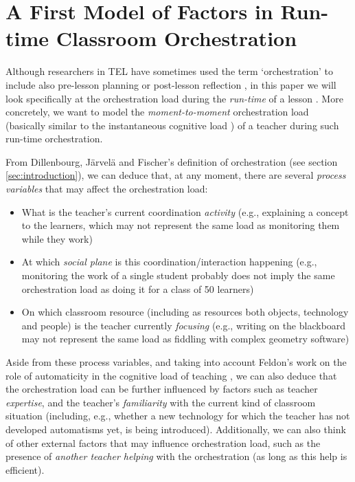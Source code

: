 \documentclass[10pt,journal,compsoc]{IEEEtran}
\begin{document}
\section{A First Model of Factors in Run-time Classroom Orchestration}
\label{sec:model}

Although researchers in TEL have sometimes used the term `orchestration' to include also pre-lesson planning or post-lesson reflection \cite{Prieto2011}, in this paper we will look specifically at the orchestration load during the \textit{run-time} of a lesson \cite{Dillenbourg2013}. More concretely, we want to model the \textit{moment-to-moment} orchestration load (basically similar to the instantaneous cognitive load \cite{xie2000prediction}) of a teacher during such run-time orchestration.

From Dillenbourg, J\"arvel\"a and Fischer's definition of orchestration \cite{Dillenbourg2009} (see section \ref{sec:introduction}), we can deduce that, at any moment, there are several \textit{process variables} that may affect the orchestration load: 

\begin{itemize}
\item What is the teacher's current coordination \textit{activity} (e.g., explaining a concept to the learners, which may not represent the same load as monitoring them while they work)
\item At which \textit{social plane} is this coordination/interaction happening (e.g., monitoring the work of a single student probably does not imply the same orchestration load as doing it for a class of 50 learners)
\item On which classroom resource (including as resources both objects, technology and people) is the teacher currently \textit{focusing} (e.g., writing on the blackboard may not represent the same load as fiddling with complex geometry software)
\end{itemize}

Aside from these process variables, and taking into account Feldon's work on the role of automaticity in the cognitive load of teaching \cite{feldon2007cognitive}, we can also deduce that the orchestration load can be further influenced by factors such as teacher \textit{expertise}, and the teacher's \textit{familiarity} with the current kind of classroom situation (including, e.g., whether a new technology for which the teacher has not developed automatisms yet, is being introduced). Additionally, we can also think of other external factors that may influence orchestration load, such as the presence of \textit{another teacher helping} with the orchestration (as long as this help is efficient).
\end{document}

